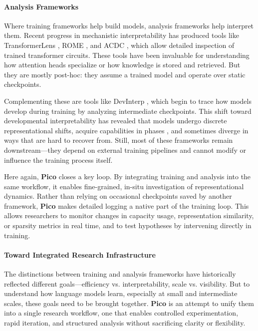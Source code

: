 \paragraph{Analysis Frameworks}
Where training frameworks help build models, analysis frameworks help interpret them. Recent progress in mechanistic interpretability has produced tools like TransformerLens \citep{nanda2022transformerlens}, ROME \citep{meng2022locating}, and ACDC \citep{conmy2023towards}, which allow detailed inspection of trained transformer circuits. These tools have been invaluable for understanding how attention heads specialize or how knowledge is stored and retrieved. But they are mostly post-hoc: they assume a trained model and operate over static checkpoints.

Complementing these are tools like DevInterp \citep{devinterpcode}, which begin to trace how models develop during training by analyzing intermediate checkpoints. This shift toward developmental interpretability has revealed that models undergo discrete representational shifts, acquire capabilities in phases \citep{hoogland2023towards, hoogland2025losslandscape}, and sometimes diverge in ways that are hard to recover from. Still, most of these frameworks remain downstream—they depend on external training pipelines and cannot modify or influence the training process itself.

Here again, \textbf{Pico} closes a key loop. By integrating training and analysis into the same workflow, it enables fine-grained, in-situ investigation of representational dynamics. Rather than relying on occasional checkpoints saved by another framework, \textbf{Pico} makes detailed logging a native part of the training loop. This allows researchers to monitor changes in capacity usage, representation similarity, or sparsity metrics in real time, and to test hypotheses by intervening directly in training.

\paragraph{Toward Integrated Research Infrastructure}
The distinctions between training and analysis frameworks have historically reflected different goals—efficiency vs. interpretability, scale vs. visibility. But to understand how language models learn, especially at small and intermediate scales, these goals need to be brought together. \textbf{Pico} is an attempt to unify them into a single research workflow, one that enables controlled experimentation, rapid iteration, and structured analysis without sacrificing clarity or flexibility.

